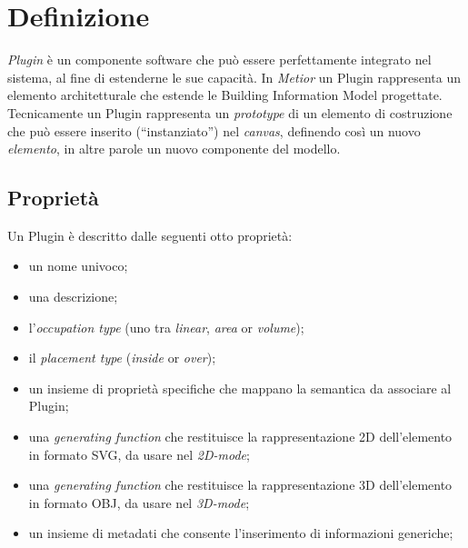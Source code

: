 \section{Definizione}
\label{sec:chapter_3_section_1}

\emph{Plugin} \`e un componente software che può essere perfettamente integrato nel sistema, al fine di estenderne
le sue capacità.
In \emph{Metior} un Plugin rappresenta un elemento architetturale che estende le Building Information Model progettate.
Tecnicamente un Plugin rappresenta un \emph{prototype} di un elemento di
costruzione che può essere inserito (``instanziato'') nel \emph{canvas}, definendo cos\`i un nuovo \emph{elemento},
in altre parole un nuovo componente del modello.
\newpage

\subsection*{Proprietà}
\noindent
Un Plugin \`e descritto dalle seguenti otto propriet\`a:
\begin{itemize}
  \item un nome univoco;
  \item una descrizione;
  \item l'\emph{occupation type} (uno tra \emph{linear}, \emph{area} or \emph{volume});
  \item il \emph{placement type} (\emph{inside} or \emph{over});
  \item un insieme di proprietà specifiche che mappano la semantica da associare al Plugin;
  \item  una \emph{generating function} che restituisce la rappresentazione 2D dell'elemento in formato SVG, da usare nel \emph{2D-mode};
  \item  una \emph{generating function} che restituisce la rappresentazione 3D dell'elemento in formato OBJ, da usare nel  \emph{3D-mode};
  \item un insieme di metadati che consente l'inserimento di informazioni generiche;
\end{itemize}
